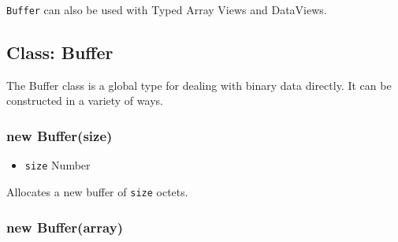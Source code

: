\texttt{Buffer} can also be used with Typed Array Views and DataViews.

\begin{Shaded}
\begin{Highlighting}[]
  \NormalTok{);}
  
  

\NormalTok{ui16[}\NormalTok{] = }\NormalTok{;}
\NormalTok{ui16[}\NormalTok{] = }\NormalTok{;}

\NormalTok{(}\NormalTok{, }\NormalTok{);       }
\NormalTok{(}\NormalTok{, }\NormalTok{, }\NormalTok{); }

\end{Highlighting}
\end{Shaded}

\subsection{Class: Buffer}

The Buffer class is a global type for dealing with binary data directly.
It can be constructed in a variety of ways.

\subsubsection{new Buffer(size)}

\begin{itemize}
\item
  \texttt{size} Number
\end{itemize}

Allocates a new buffer of \texttt{size} octets.

\subsubsection{new Buffer(array)}

